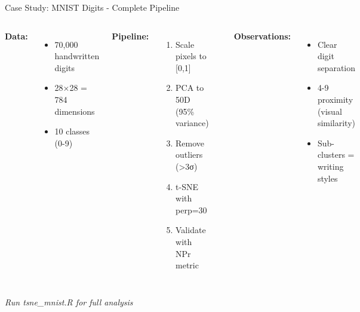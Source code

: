 \documentclass[aspectratio=169]{beamer}
\begin{document}
\begin{frame}{Case Study: MNIST Digits - Complete Pipeline}
\begin{columns}
\textbf{Data:}
\begin{itemize}
\item 70,000 handwritten digits
\item 28×28 = 784 dimensions
\item 10 classes (0-9)
\end{itemize}

\textbf{Pipeline:}
\begin{enumerate}
\item Scale pixels to [0,1]
\item PCA to 50D (95\% variance)
\item Remove outliers (>3σ)
\item t-SNE with perp=30
\item Validate with NPr metric
\end{enumerate}

\includegraphics[width=\textwidth]{./Figures/mnist_tsne_result.png}

\textbf{Observations:}
\begin{itemize}
\item Clear digit separation
\item 4-9 proximity (visual similarity)
\item Sub-clusters = writing styles
\end{itemize}
\end{columns}

\textit{Run tsne\_mnist.R for full analysis}
\end{frame}
\end{document}
